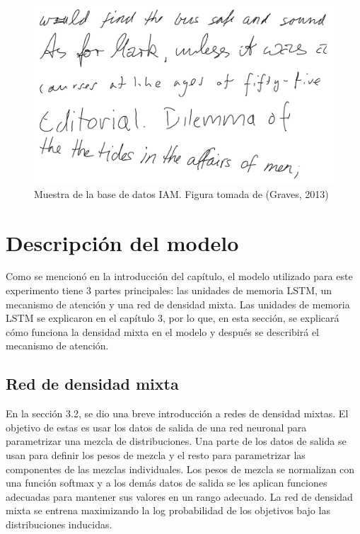 \begin{figure}[h]
\begin{center}
\includegraphics[width=150mm, scale = 0.8]{./imag/iam.png}
\end{center}
\caption{Muestra de la base de datos IAM. Figura tomada de (Graves, 2013) }
\end{figure}

\section{Descripción del modelo}
Como se mencionó en la introducción del capítulo, el modelo utilizado para este experimento tiene 3 partes principales: las unidades de memoria LSTM, un mecanismo de atención y una red de densidad mixta. Las unidades de memoria LSTM se explicaron en el capítulo 3, por lo que, en esta sección, se explicará cómo funciona la densidad mixta en el modelo y después se describirá el mecanismo de atención. 

\subsection{Red de densidad mixta}
En la sección 3.2, se dio una breve introducción a redes de densidad mixtas. El objetivo de estas es usar los datos de salida de una red neuronal para parametrizar una mezcla de distribuciones. Una parte de los datos de salida se usan para definir los pesos de mezcla y el resto para parametrizar las componentes de las mezclas individuales. Los pesos de mezcla se normalizan con una función softmax y a los demás datos de salida se les aplican funciones adecuadas para mantener sus valores en un rango adecuado. La red de densidad mixta se entrena maximizando la log probabilidad de los objetivos bajo las distribuciones inducidas.
\cite{DBLP:journals/corr/Graves13}

